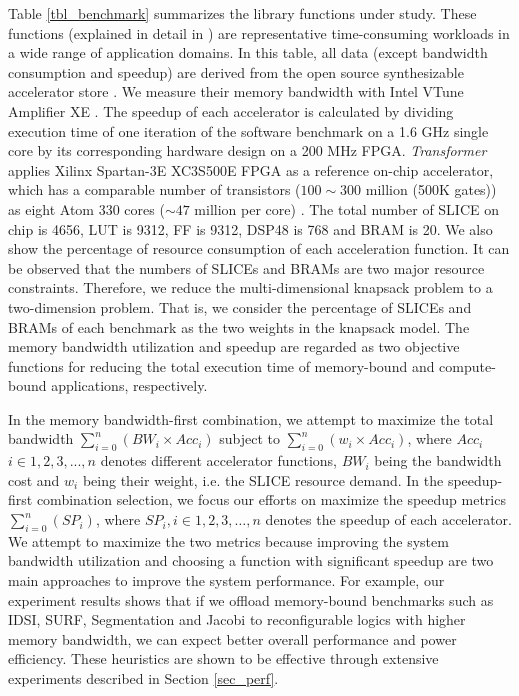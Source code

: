 Table \ref{tbl_benchmark} summarizes the library functions under
study. These functions (explained in detail in \cite{accstore}) are
representative time-consuming workloads in a wide range of application
domains.  In this table, all data (except bandwidth consumption and
speedup) are derived from the open source synthesizable accelerator
store \cite{accstore}. We measure their memory bandwidth with Intel
VTune Amplifier XE \cite{vtune}. The speedup of each accelerator is
calculated by dividing execution time of one iteration of the software
benchmark on a 1.6 GHz single core by its corresponding hardware design
on a 200 MHz FPGA. {\em Transformer} applies Xilinx Spartan-3E XC3S500E
FPGA \cite{spartan3e} as a reference on-chip accelerator, which has a
comparable number of transistors ({$100\sim300$ million (500K gates)})
as eight Atom 330 cores ({$\sim 47$ million per core})
\cite{atom-spec}. The total number of SLICE on chip is 4656, LUT is
9312, FF is 9312, DSP48 is 768 and BRAM is 20. We also show the
percentage of resource consumption of each acceleration function. It
can be observed that the numbers of SLICEs and BRAMs are two major
resource constraints. Therefore, we reduce the multi-dimensional
knapsack problem to a two-dimension problem. That is, we consider the
percentage of SLICEs and BRAMs of each benchmark as the two weights in
the knapsack model. The memory bandwidth utilization and speedup are
regarded as two objective functions for reducing the total execution
time of memory-bound and compute-bound applications, respectively.

In the memory bandwidth-first combination, we attempt to maximize the
total bandwidth $\sum_{i=0}^{n}(BW_i \times Acc_i) $ subject to
$\sum_{i=0}^{n}(w_i \times Acc_i) $, where $Acc_i$ $i \in {1,2,3,
  ... ,n}$ denotes different accelerator functions, $BW_i$ being the
bandwidth cost and $w_i$ being their weight, i.e. the SLICE resource
demand. In the speedup-first combination selection, we focus our
efforts on maximize the speedup metrics $\sum_{i=0}^{n}(SP_i) $, where
$SP_i , i \in {1,2,3, \ldots, n}$ denotes the speedup of each
accelerator. We attempt to maximize the two metrics because improving
the system bandwidth utilization and choosing a function with
significant speedup are two main approaches to improve the system
performance. For example, our experiment results shows that if we
offload memory-bound benchmarks such as IDSI, SURF, Segmentation and
Jacobi to reconfigurable logics with higher memory bandwidth, we can
expect better overall performance and power efficiency. These
heuristics are shown to be effective through extensive experiments
described in Section \ref{sec_perf}.

